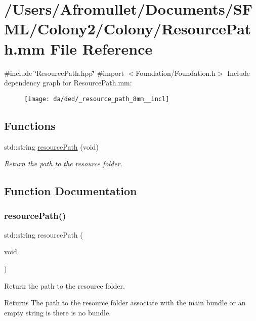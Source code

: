 \hypertarget{_resource_path_8mm}{}\section{/\+Users/\+Afromullet/\+Documents/\+S\+F\+M\+L/\+Colony2/\+Colony/\+Resource\+Path.mm File Reference}
\label{_resource_path_8mm}
{\ttfamily \#include \char`\"{}Resource\+Path.\+hpp\char`\"{}}\newline
{\ttfamily \#import $<$Foundation/\+Foundation.\+h$>$}\newline
Include dependency graph for Resource\+Path.\+mm\+:
\nopagebreak
\begin{figure}[H]
\begin{center}
\leavevmode
\texttt{[image: da/ded/\_resource\_path\_8mm\_\_incl]}
\end{center}
\end{figure}
\subsection*{Functions}
\begin{DoxyCompactItemize}
\item 
std\+::string \mbox{\hyperlink{_resource_path_8mm_a377b456e3964835648f2d726c2e4f510}{resource\+Path}} (void)
\begin{DoxyCompactList}\small\item\em Return the path to the resource folder. \end{DoxyCompactList}\end{DoxyCompactItemize}


\subsection{Function Documentation}
\mbox{\label{_resource_path_8mm_a377b456e3964835648f2d726c2e4f510}} 
\subsubsection{\texorpdfstring{resource\+Path()}{resourcePath()}}
{\footnotesize\ttfamily std\+::string resource\+Path (\begin{DoxyParamCaption}\item[{void}]{ }\end{DoxyParamCaption})}



Return the path to the resource folder. 

\begin{DoxyReturn}{Returns}
The path to the resource folder associate with the main bundle or an empty string is there is no bundle. \begin{DoxyVerb}\end{DoxyVerb}
 
\end{DoxyReturn}
